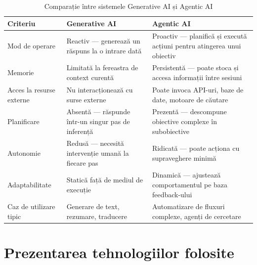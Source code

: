 \documentclass[12pt, a4paper, oneside, romanian]{teza-upb}
\begin{document}
\begin{table}[H]
\centering
\renewcommand{\arraystretch}{1.4}
\begin{tabular}{|p{3.5cm}|p{5cm}|p{5cm}|}
\hline
\textbf{Criteriu} & \textbf{Generative AI} & \textbf{Agentic AI} \\
\hline
Mod de operare & Reactiv — generează un răspuns la o intrare dată & Proactiv — planifică și execută acțiuni pentru atingerea unui obiectiv \\
\hline
Memorie & Limitată la fereastra de context curentă & Persistentă — poate stoca și accesa informații între sesiuni \\
\hline
Acces la resurse externe & Nu interacționează cu surse externe & Poate invoca API-uri, baze de date, motoare de căutare \\
\hline
Planificare & Absentă — răspunde într-un singur pas de inferență & Prezentă — descompune obiective complexe în subobiective \\
\hline
Autonomie & Redusă — necesită intervenție umană la fiecare pas & Ridicată — poate acționa cu supraveghere minimă \\
\hline
Adaptabilitate & Statică față de mediul de execuție & Dinamică — ajustează comportamentul pe baza feedback-ului \\
\hline
Caz de utilizare tipic & Generare de text, rezumare, traducere & Automatizare de fluxuri complexe, agenți de cercetare \\
\hline
\end{tabular}
\caption{Comparație între sistemele Generative AI și Agentic AI}
\label{tab:gen_vs_agentic}
\end{table}



\cleardoublepage
\chapter{Prezentarea tehnologiilor folosite}
\end{document}
